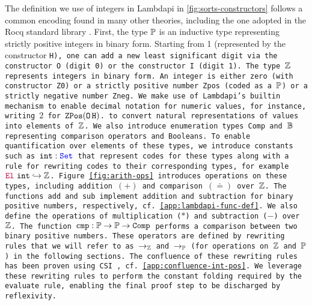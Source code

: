 The definition we use of integers in Lambdapi in \cref{fig:sorts-constructors} follows a common encoding found in many other theories, including the one adopted in the Rocq standard library \cite{Rocq-refman}.
First, the type $\mathbb{P}$  is an inductive type representing strictly positive integers in binary form.
Starting from 1 (represented by the constructor \tt{H}), one can add a new least significant digit via the constructor \tt{O} (digit 0) or the constructor \tt{I} (digit 1). 
The type $\mathbb{Z}$ represents integers in binary form.
An integer is either zero (with constructor \tt{Z0}) or a strictly positive number \tt{Zpos} (coded as a $\mathbb{P}$) or a strictly negative number \tt{Zneg}.
We make use of Lambdapi's \lstinline[language=Lambdapi,basicstyle=\ttfamily\footnotesize]|builtin| mechanism to enable decimal notation for numeric values, for instance, writing $2$ for $\mathop{\texttt{ZPos}} (\mathop{\texttt{O}} \texttt{H})$.
to convert natural representations of values into elements of $\mathbb{Z}$.
%
We also introduce enumeration types \tt{Comp} and $\mathbb{B}$ representing comparison operators and Booleans. 
%
To enable quantification over elements of these types, we introduce constants such as $\texttt{int}: \textcolor{blue}{\texttt{\upshape{Set}}}$ that represent codes for these types along with a rule for rewriting codes to their corresponding types, for example $\textcolor{purple}{\mathop{\texttt{\upshape{El}}}}~\texttt{int} \hookrightarrow \mathbb{Z}$.
Figure~\ref{fig:arith-ops} introduces operations on these types, including addition $(+)$ and comparison $(\doteq)$ over $\mathbb{Z}$. The functions \texttt{add} and \texttt{sub} implement addition and subtraction for binary positive numbers, respectively, cf. \cref{app:lambdapi-func-def}.
We also define the operations of multiplication ($\mathbin{*}$) and subtraction ($\mathbin{-}$) over $\mathbb{Z}$. 
The function $\texttt{cmp}: \mathbb{P} \to \mathbb{P} \to \texttt{Comp}$ performs a comparison between two binary positive numbers. 
These operators are defined by rewriting rules that we will refer to as $\rightarrow_\mathbb{Z}$ and $\rightarrow_\mathbb{P}$ (for operations on $\mathbb{Z}$ and $\mathbb{P}$) in the following sections.
The confluence of these rewriting rules has been proven using CSI \cite{CSI}, cf. \cref{app:confluence-int-pos}. 
We leverage these rewriting rules to perform the constant folding required by the \texttt{evaluate} rule, enabling the final proof step to be discharged by reflexivity.

